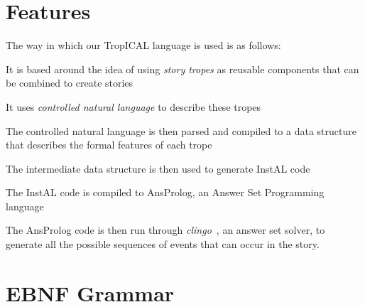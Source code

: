 \section{Features}
\label{sec:t-features}

The way in which our TropICAL language is used is as follows:

\begin{compactitem}
  \item It is based around the idea of using \emph{story tropes} as reusable
    components that can be combined to create stories
  \item It uses \emph{controlled natural language} to describe these tropes
  \item The controlled natural language is then parsed and compiled to a data
    structure that describes the formal features of each trope
  \item The intermediate data structure is then used to generate InstAL code
  \item The InstAL code is compiled to AnsProlog, an Answer Set Programming
    language
  \item The AnsProlog code is then run through
    \emph{clingo}~\cite{gebser2011potassco}, an answer set solver, to generate
    all the possible sequences of events that can occur in the story.
\end{compactitem}


\section{EBNF Grammar}
\label{sec:t-grammar}

